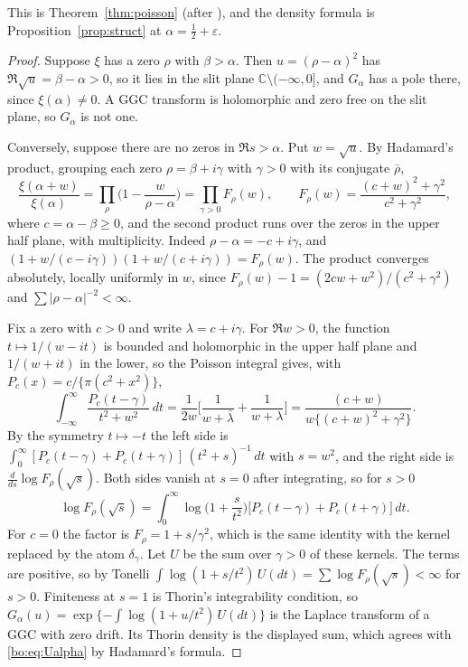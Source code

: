 This is Theorem~\ref{thm:poisson} (after \cite{P26}), and the density formula is Proposition~\ref{prop:struct} at $\alpha=\frac12+\varepsilon$.

\begin{proof}
Suppose $\xi$ has a zero $\rho$ with $\beta>\alpha$. Then $u=(\rho-\alpha)^2$ has $\Re\sqrt u=\beta-\alpha>0$, so it lies in the slit plane $\mathbb C\setminus(-\infty,0]$, and $G_\alpha$ has a pole there, since $\xi(\alpha)\ne0$. A GGC transform is holomorphic and zero free on the slit plane, so $G_\alpha$ is not one.

Conversely, suppose there are no zeros in $\Re s>\alpha$. Put $w=\sqrt u$. By Hadamard's product, grouping each zero $\rho=\beta+i\gamma$ with $\gamma>0$ with its conjugate $\bar\rho$,
\[
\frac{\xi(\alpha+w)}{\xi(\alpha)}=\prod_{\rho}\Big(1-\frac{w}{\rho-\alpha}\Big)=\prod_{\gamma>0}F_\rho(w),\qquad F_\rho(w)=\frac{(c+w)^2+\gamma^2}{c^2+\gamma^2},
\]
where $c=\alpha-\beta\ge0$, and the second product runs over the zeros in the upper half plane, with multiplicity. Indeed $\rho-\alpha=-c+i\gamma$, and $(1+w/(c-i\gamma))(1+w/(c+i\gamma))=F_\rho(w)$. The product converges absolutely, locally uniformly in $w$, since $F_\rho(w)-1=(2cw+w^2)/(c^2+\gamma^2)$ and $\sum|\rho-\alpha|^{-2}<\infty$.

Fix a zero with $c>0$ and write $\lambda=c+i\gamma$. For $\Re w>0$, the function $t\mapsto1/(w-it)$ is bounded and holomorphic in the upper half plane and $1/(w+it)$ in the lower, so the Poisson integral gives, with $P_c(x)=c/\{\pi(c^2+x^2)\}$,
\[
\int_{-\infty}^\infty\frac{P_c(t-\gamma)}{t^2+w^2}\,dt=\frac1{2w}\Big[\frac1{w+\bar\lambda}+\frac1{w+\lambda}\Big]=\frac{(c+w)}{w\{(c+w)^2+\gamma^2\}} .
\]
By the symmetry $t\mapsto-t$ the left side is $\int_0^\infty[P_c(t-\gamma)+P_c(t+\gamma)]\,(t^2+s)^{-1}\,dt$ with $s=w^2$, and the right side is $\frac{d}{ds}\log F_\rho(\sqrt s)$. Both sides vanish at $s=0$ after integrating, so for $s>0$
\[
\log F_\rho(\sqrt s)=\int_0^\infty\log\Big(1+\frac s{t^2}\Big)\big[P_c(t-\gamma)+P_c(t+\gamma)\big]\,dt .
\]
For $c=0$ the factor is $F_\rho=1+s/\gamma^2$, which is the same identity with the kernel replaced by the atom $\delta_\gamma$. Let $U$ be the sum over $\gamma>0$ of these kernels. The terms are positive, so by Tonelli $\int\log(1+s/t^2)\,U(dt)=\sum\log F_\rho(\sqrt s)<\infty$ for $s>0$. Finiteness at $s=1$ is Thorin's integrability condition, so $G_\alpha(u)=\exp\{-\int\log(1+u/t^2)\,U(dt)\}$ is the Laplace transform of a GGC with zero drift. Its Thorin density is the displayed sum, which agrees with \eqref{bo:eq:Ualpha} by Hadamard's formula.
\end{proof}


